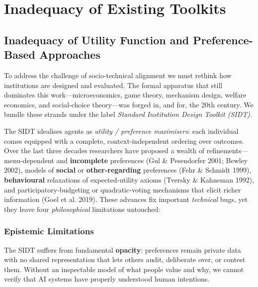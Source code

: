 \section{Inadequacy of Existing Toolkits}

\subsection{Inadequacy of Utility Function and Preference-Based Approaches}

To address the challenge of socio‑technical alignment we must rethink how institutions are designed and evaluated. The formal apparatus that still dominates this work—microeconomics, game theory, mechanism design, welfare economics, and social‑choice theory—was forged in, and for, the 20th century. We bundle these strands under the label \textit{Standard Institution Design Toolkit (SIDT)}.

The SIDT idealises agents as \textit{utility / preference maximisers}: each individual comes equipped with a complete, context‑independent ordering over outcomes. Over the last three decades researchers have proposed a wealth of refinements—menu‑dependent and \textbf{incomplete} preferences (Gul \& Pesendorfer 2001; Bewley 2002), models of \textbf{social} or \textbf{other‑regarding} preferences (Fehr \& Schmidt 1999), \textbf{behavioural} relaxations of expected‑utility axioms (Tversky \& Kahneman 1992), and participatory-budgeting or quadratic-voting mechanisms that elicit richer information (Goel et al. 2019). These advances fix important \textit{technical} bugs, yet they leave four \textit{philosophical} limitations untouched:

\subsubsection{Epistemic Limitations}

The SIDT suffers from fundamental \textbf{opacity}: preferences remain private data with no shared representation that lets others audit, deliberate over, or contest them\footnotemark{}. Without an inspectable model of what people value and why, we cannot verify that AI systems have properly understood human intentions.


